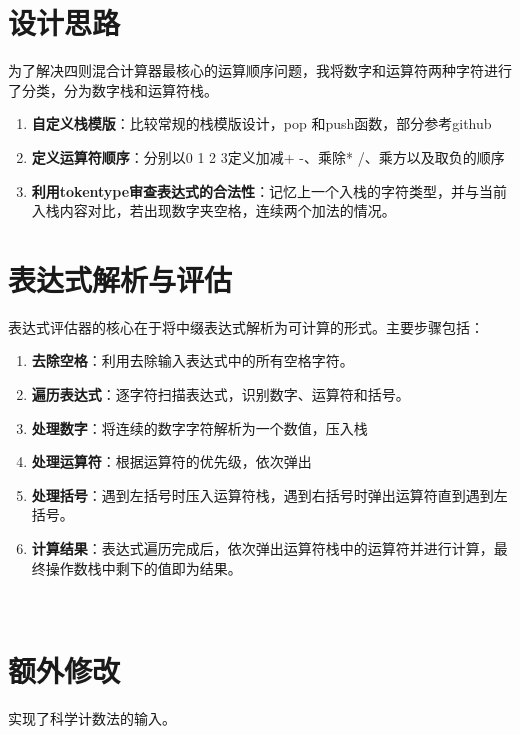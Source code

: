 \documentclass[UTF8]{ctexart}
\begin{document}
\pagestyle{fancy}
\fancyhead{}

\section{设计思路}

\Large{为了解决四则混合计算器最核心的运算顺序问题，我将数字和运算符两种字符进行了分类，分为数字栈和运算符栈。}\\
\large
\begin{enumerate}
    \item \textbf{自定义栈模版}：比较常规的栈模版设计，pop 和push函数，部分参考github
    \item \textbf{定义运算符顺序}：分别以0 1 2 3定义加减+ -、乘除* /、乘方以及取负的顺序\\
    \item \textbf{利用tokentype审查表达式的合法性}：记忆上一个入栈的字符类型，并与当前入栈内容对比，若出现数字夹空格，连续两个加法的情况。
    
\end{enumerate}

   \section{表达式解析与评估}
表达式评估器的核心在于将中缀表达式解析为可计算的形式。主要步骤包括：

\begin{enumerate}
    \item \textbf{去除空格}：利用去除输入表达式中的所有空格字符。
    \item \textbf{遍历表达式}：逐字符扫描表达式，识别数字、运算符和括号。
    \item \textbf{处理数字}：将连续的数字字符解析为一个数值，压入栈
    \item \textbf{处理运算符}：根据运算符的优先级，依次弹出
    \item \textbf{处理括号}：遇到左括号时压入运算符栈，遇到右括号时弹出运算符直到遇到左括号。
    \item \textbf{计算结果}：表达式遍历完成后，依次弹出运算符栈中的运算符并进行计算，最终操作数栈中剩下的值即为结果。
\end{enumerate}
\\
\section{额外修改}
实现了科学计数法的输入。
\end{document}
